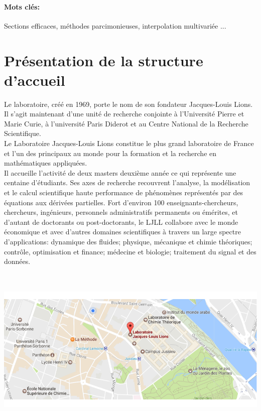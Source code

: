 \paragraph{Mots clés:} Sections efficaces, méthodes parcimonieuses, interpolation multivariée ...

\newpage
\section{Présentation de la structure d’accueil}\label{sec:2}
\hspace{0.5cm}
Le laboratoire, créé en 1969, porte le nom de son fondateur Jacques-Louis Lions.
Il s’agit maintenant d’une unité de recherche conjointe à l’Université Pierre et Marie Curie,
à l’université Paris Diderot et au Centre National de la Recherche Scientifique. \\

Le Laboratoire Jacques-Louis Lions constitue le plus grand laboratoire de France et l’un
des principaux au monde pour la formation et la recherche en mathématiques appliquées. \\

Il accueille l’activité de deux masters deuxième année ce qui représente une centaine d’étudiants.
Ses axes de recherche recouvrent l’analyse, la modélisation et le calcul scientifique haute
performance de phénomènes représentés par des équations aux dérivées partielles.
Fort d’environ 100 enseignants-chercheurs, chercheurs, ingénieurs, personnels administratifs
permanents ou émérites, et d’autant de doctorants ou post-doctorants, le LJLL collabore avec
le monde économique et avec d’autres domaines scientifiques à travers un large spectre
d’applications: dynamique des fluides; physique, mécanique et chimie théoriques; contrôle,
optimisation et finance; médecine et biologie; traitement du signal et des données.
\begin{center}
\includegraphics[height=8cm,width=0.9\linewidth]{images/Localisation.png}
\end{center}

\newpage




